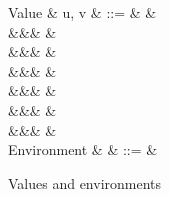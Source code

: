 \begin{figure}[H]
\begin{syntaxfig}
\mbox{Value}
&
u, v
&
::=
&
\exTrue \mid \exFalse
&
\\
&&&
&
\\
&&&
\exNil
&
\\
&&&
&
\\
&&&
&
\\
&&&
&
\\
&&&
&
\\[2mm]
\mbox{Environment}
&
\rho
&
::=
&
\end{syntaxfig}
\caption{Values and environments}
\label{fig:core-syntax-value}
\end{figure}

